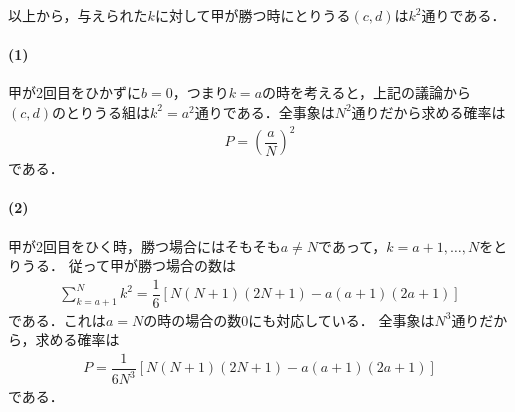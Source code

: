 \documentclass[../../main.tex]{subfiles}
\begin{document}
以上から，与えられた$k$に対して甲が勝つ時にとりうる$(c,d)$は$k^2$通りである．

\paragraph{(1)}

甲が2回目をひかずに$b=0$，つまり$k=a$の時を考えると，上記の議論から$(c,d)$のとりうる組は$k^2=a^2$通りである．全事象は$N^2$通りだから求める確率は
\begin{align}
  P=\left(\dfrac{a}{N}\right)^2
\end{align}
である．

\paragraph{(2)}

甲が2回目をひく時，勝つ場合にはそもそも$a\neq N$であって，$k=a+1,\ldots,N$をとりうる．
従って甲が勝つ場合の数は
\begin{align}
  \sum_{k=a+1}^Nk^2=\dfrac{1}{6}\left[N(N+1)(2N+1)-a(a+1)(2a+1)\right]
\end{align}
である．これは$a=N$の時の場合の数$0$にも対応している．
全事象は$N^3$通りだから，求める確率は
\begin{align}
  P=\dfrac{1}{6N^3}\left[N(N+1)(2N+1)-a(a+1)(2a+1)\right]
\end{align}
である．
\end{document}
